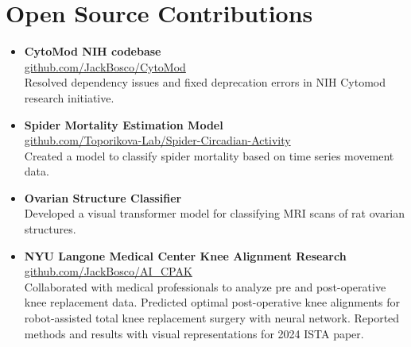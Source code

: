 \section*{Open Source Contributions}
\begin{itemize}[leftmargin=*]
    \item \textbf{CytoMod NIH codebase} \\
    \href{https://github.com/JackBosco/CytoMod}{github.com/JackBosco/CytoMod} \\
    Resolved dependency issues and fixed deprecation errors in NIH Cytomod research initiative.
    
    \item \textbf{Spider Mortality Estimation Model} \\
    \href{https://github.com/Toporikova-Lab/Spider-Circadian-Activity/tree/main/Spider\%20Mortality\%20estimation\%20model}{github.com/Toporikova-Lab/Spider-Circadian-Activity} \\
    Created a model to classify spider mortality based on time series movement data.

    \item \textbf{Ovarian Structure Classifier} \\
    Developed a visual transformer model for classifying MRI scans of rat ovarian structures.
    
    \item \textbf{NYU Langone Medical Center Knee Alignment Research} \\
    \href{https://github.com/JackBosco/AI_CPAK}{github.com/JackBosco/AI\_CPAK} \\
    Collaborated with medical professionals to analyze pre and post-operative knee replacement data. 
    Predicted optimal post-operative knee alignments for robot-assisted total knee replacement surgery with neural network.
    Reported methods and results with visual representations for 2024 ISTA paper.
\end{itemize}
